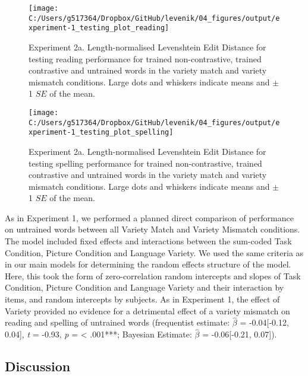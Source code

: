 \documentclass[doc,floatsintext]{apa6}
\begin{document}
\begin{figure}[htb]

{\centering \texttt{[image: C:/Users/g517364/Dropbox/GitHub/levenik/04\_figures/output/experiment-1\_testing\_plot\_reading]} 

}

\caption{Experiment 2a. Length-normalised Levenshtein Edit Distance for testing reading performance for trained non-contrastive, trained contrastive and untrained words in the variety match and variety mismatch conditions. Large dots and whiskers indicate means and $\pm$ 1 $SE$ of the mean.}\label{fig:ex1-test-reading-plots}
\end{figure}

\begin{figure}[htb]

{\centering \texttt{[image: C:/Users/g517364/Dropbox/GitHub/levenik/04\_figures/output/experiment-1\_testing\_plot\_spelling]} 

}

\caption{Experiment 2a. Length-normalised Levenshtein Edit Distance for testing spelling performance for trained non-contrastive, trained contrastive and untrained words in the variety match and variety mismatch conditions. Large dots and whiskers indicate means and $\pm$ 1 $SE$ of the mean.}\label{fig:ex1-test-spelling-plots}
\end{figure}

As in Experiment 1, we performed a planned direct comparison of
performance on untrained words between all Variety Match and Variety
Mismatch conditions. The model included fixed effects and interactions
between the sum-coded Task Condition, Picture Condition and Language
Variety. We used the same criteria as in our main models for determining
the random effects structure of the model. Here, this took the form of
zero-correlation random intercepts and slopes of Task Condition, Picture
Condition and Language Variety and their interaction by items, and
random intercepts by subjects. As in Experiment 1, the effect of Variety
provided no evidence for a detrimental effect of a variety mismatch on
reading and spelling of untrained words (frequentist estimate:
\(\hat{\beta}\) = -0.04{[}-0.12, 0.04{]}, \emph{t} = -0.93, \emph{p} =
\textless{} .001***; Bayesian Estimate: \(\hat{\beta}\) = -0.06{[}-0.21,
0.07{]}).

\subsection{Discussion}\label{discussion-1}
\end{document}
